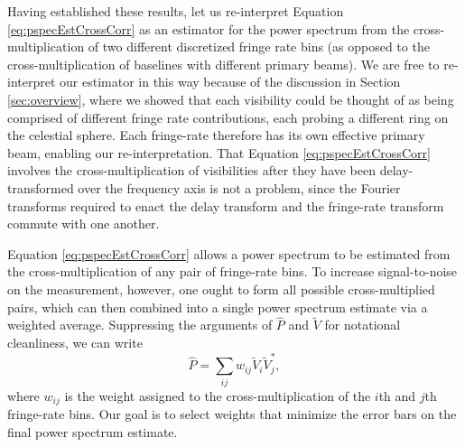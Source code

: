 \documentclass[twocolumn,apj,numberedappendix]{emulateapj}
\begin{document}
Having established these results, let us re-interpret Equation \eqref{eq:pspecEstCrossCorr} as an estimator for the power spectrum from the cross-multiplication of two different discretized fringe rate bins (as opposed to the cross-multiplication of baselines with different primary beams). We are free to re-interpret our estimator in this way because of the discussion in Section \ref{sec:overview}, where we showed that each visibility could be thought of as being comprised of different fringe rate contributions, each probing a different ring on the celestial sphere. Each fringe-rate therefore has its own effective primary beam, enabling our re-interpretation. That Equation \eqref{eq:pspecEstCrossCorr} involves the cross-multiplication of visibilities after they have been delay-transformed over the frequency axis is not a problem, since the Fourier transforms required to enact the delay transform and the fringe-rate transform commute with one another.

Equation \eqref{eq:pspecEstCrossCorr} allows a power spectrum to be estimated from the cross-multiplication of any pair of fringe-rate bins. To increase signal-to-noise on the measurement, however, one ought to form all possible cross-multiplied pairs, which can then combined into a single power spectrum estimate via a weighted average. Suppressing the arguments of $\widehat{P}$ and $\widetilde{V}$ for notational cleanliness, we can write
\begin{equation}
\widehat{P} = \sum_{ij} w_{ij} \widetilde{V}_i \widetilde{V}_j^*,
\end{equation}
where $w_{ij}$ is the weight assigned to the cross-multiplication of the $i$th and $j$th fringe-rate bins. Our goal is to select weights that minimize the error bars on the final power spectrum estimate. 
\end{document}
